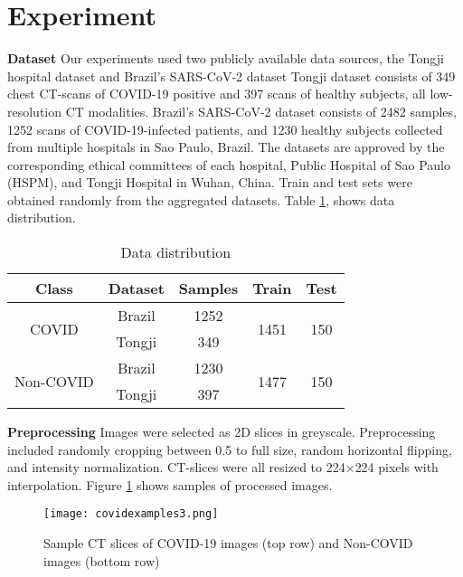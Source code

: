 

 
\section{Experiment}
\textbf{Dataset} Our experiments used two publicly available data sources, the Tongji hospital dataset\cite{yang2020covid} and Brazil's SARS-CoV-2 dataset\cite{soares2020sars} Tongji dataset consists of 349 chest CT-scans of COVID-19 positive and 397 scans of healthy subjects, all low-resolution CT modalities. Brazil's SARS-CoV-2 dataset consists of 2482 samples, 1252 scans of COVID-19-infected patients, and 1230 healthy subjects collected from multiple hospitals in Sao Paulo, Brazil. The datasets are approved by the corresponding ethical committees of each hospital, Public Hospital of Sao Paulo (HSPM), and Tongji Hospital in Wuhan, China. Train and test sets were obtained randomly from the aggregated datasets. Table \ref{table_datadist}, shows data distribution.


\begin{table}[h!]
\centering
\setlength{\tabcolsep}{6pt}
\renewcommand\arraystretch{1.22}
\caption{ \small Data distribution}
\begin{tabular}{| *{5}{c|} }
\hline
Class  & Dataset & Samples & Train & Test
\\   \hline  
\multirow{2}{3em}{COVID}     &Brazil&1252&\multirow{2}{2em}{1451}  &\multirow{2}{2em}{150}  \\
&Tongji&349&&  \\
\hline
\multirow{2}{6em}{Non-COVID}     &Brazil&1230&\multirow{2}{2em}{1477}  &\multirow{2}{2em}{150}  \\
&Tongji&397&&  \\
\hline
\end{tabular}
\label{table_datadist} 
\end{table}


\textbf{Preprocessing}
Images were selected as 2D slices in greyscale. Preprocessing included randomly cropping between 0.5 to full size, random horizontal flipping, and intensity normalization. CT-slices were all resized to 224$\times$224 pixels with interpolation. Figure \ref{fig:samplesCTs} shows samples of processed images.
\begin{figure}[h!]
 \centering
 \texttt{[image: covidexamples3.png]}
 \caption{Sample CT slices of COVID-19 images (top row) and Non-COVID images (bottom row)}
 \label{fig:samplesCTs}
\end{figure}


